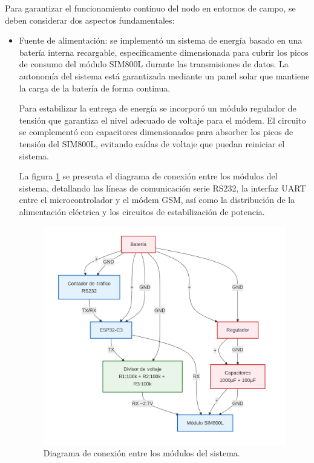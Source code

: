 Para garantizar el funcionamiento continuo del nodo en entornos de campo,
se deben considerar dos aspectos fundamentales:
\begin{itemize}
\item Fuente de alimentación: se implementó un sistema de energía basado en una batería interna recargable, específicamente dimensionada para cubrir los picos de consumo del módulo SIM800L durante las transmisiones de datos. La autonomía del sistema está garantizada mediante un panel solar que mantiene la carga de la batería de forma continua.

Para estabilizar la entrega de energía se incorporó un módulo regulador de tensión que garantiza el nivel adecuado de voltaje para el módem. El circuito se complementó con capacitores dimensionados para absorber los picos de tensión del SIM800L, evitando caídas de voltaje que puedan reiniciar el sistema.

La figura \ref{fig:diag_conexiones} se presenta el diagrama de conexión entre los módulos del sistema, detallando las líneas de comunicación serie RS232, la interfaz UART entre el microcontrolador y el módem GSM, así como la distribución de la alimentación eléctrica y los circuitos de estabilización de potencia.

\begin{figure}[H]
  \raggedleft
  \includegraphics[width=1\linewidth]{./Figures/diagConexion.png}
  \caption{Diagrama de conexión entre los módulos del sistema.}
  \label{fig:diag_conexiones}
\end{figure}




\end{itemize}
